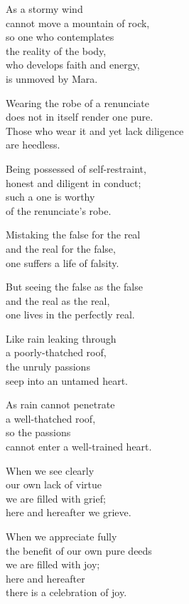 As a stormy wind\\
cannot move a mountain of rock,\\
so one who contemplates\\
the reality of the body,\\
who develops faith and energy,\\
is unmoved by Mara.

Wearing the robe of a renunciate\\
does not in itself render one pure.\\
Those who wear it and yet lack diligence\\
are heedless.

Being possessed of self-restraint,\\
honest and diligent in conduct;\\
such a one is worthy\\
of the renunciate's robe.


Mistaking the false for the real\\
and the real for the false,\\
one suffers a life of falsity.


But seeing the false as the false\\
and the real as the real,\\
one lives in the perfectly real.


Like rain leaking through\\
a poorly-thatched roof,\\
the unruly passions\\
seep into an untamed heart.


As rain cannot penetrate\\
a well-thatched roof,\\
so the passions\\
cannot enter a well-trained heart.


When we see clearly\\
our own lack of virtue\\
we are filled with grief;\\
here and hereafter we grieve.


When we appreciate fully\\
the benefit of our own pure deeds\\
we are filled with joy;\\
here and hereafter\\
there is a celebration of joy.

